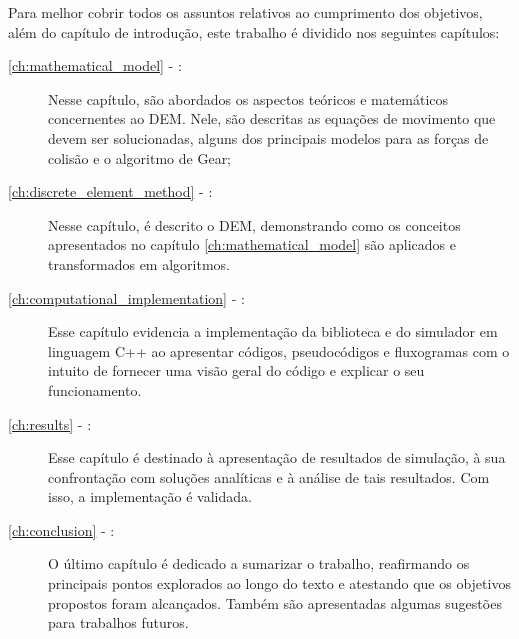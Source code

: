 Para melhor cobrir todos os assuntos relativos ao cumprimento dos objetivos, além do capítulo de introdução, este trabalho é dividido nos seguintes capítulos:
\begin{description}
	\item[\autoref{ch:mathematical_model} - :] Nesse capítulo, são abordados os aspectos teóricos e matemáticos concernentes ao DEM. Nele, são descritas as equações de movimento que devem ser solucionadas, alguns dos principais modelos para as forças de colisão e o algoritmo de Gear;
	\item[\autoref{ch:discrete_element_method} - :] Nesse capítulo, é descrito o DEM, demonstrando como os conceitos apresentados no capítulo \ref{ch:mathematical_model} são aplicados e transformados em algoritmos.
	\item[\autoref{ch:computational_implementation} - :] Esse capítulo evidencia a implementação da biblioteca e do simulador em linguagem C++ ao apresentar códigos, pseudocódigos e fluxogramas com o intuito de fornecer uma visão geral do código e explicar o seu funcionamento.
	\item[\autoref{ch:results} - :] Esse capítulo é destinado à apresentação de resultados de simulação, à sua confrontação com soluções analíticas e à análise de tais resultados. Com isso, a implementação é validada.
	\item[\autoref{ch:conclusion} - :] O último capítulo é dedicado a sumarizar o trabalho, reafirmando os principais pontos explorados ao longo do texto e atestando que os objetivos propostos foram alcançados. Também são apresentadas algumas sugestões para trabalhos futuros.
\end{description}